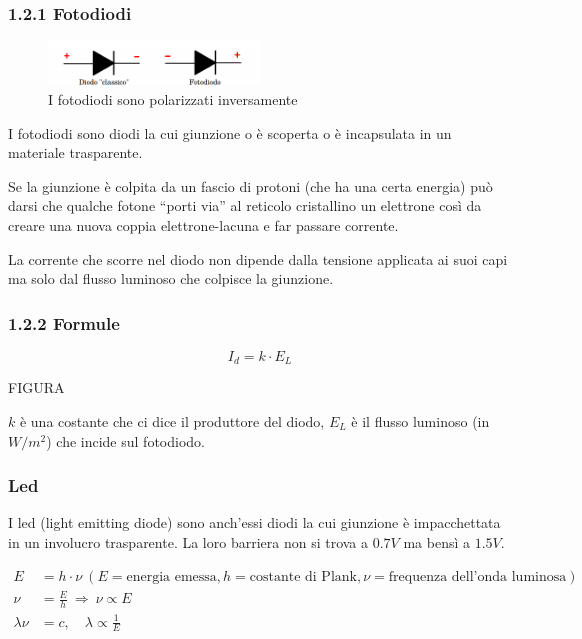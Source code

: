 \documentclass[
]{article}
\begin{document}
\subsubsection{1.2.1 Fotodiodi}\label{fotodiodi}

\begin{figure}
\centering
\includegraphics[width=0.5\textwidth,height=\textheight]{immagini/4.png}
\caption{I fotodiodi sono polarizzati inversamente}
\end{figure}

I fotodiodi sono diodi la cui giunzione o è scoperta o è incapsulata in
un materiale trasparente.

Se la giunzione è colpita da un fascio di protoni (che ha una certa
energia) può darsi che qualche fotone ``porti via'' al reticolo
cristallino un elettrone così da creare una nuova coppia
elettrone-lacuna e far passare corrente.

La corrente che scorre nel diodo non dipende dalla tensione applicata ai
suoi capi ma solo dal flusso luminoso che colpisce la giunzione.

\subsubsection{1.2.2 Formule}\label{formule-1}

\[
I_d = k \cdot E_{L}
\]

FIGURA

\(k\) è una costante che ci dice il produttore del diodo, \(E_L\) è il
flusso luminoso (in \(W /m^2\)) che incide sul fotodiodo.

\subsubsection{Led}\label{led}

I led (light emitting diode) sono anch'essi diodi la cui giunzione è
impacchettata in un involucro trasparente. La loro barriera non si trova
a \(0.7V\) ma bensì a \textbf{\(1.5V\)}.

\begin{align*}
E&=h\cdot\nu\ (E = \text{energia emessa}, h = \text{costante di Plank}, \nu = \text{frequenza
dell'onda luminosa})\\
\nu&=\frac{E}{h}\ \Longrightarrow\ \nu\propto E \\
\lambda\nu&=c, \quad \lambda\propto\frac{1}{E}
\end{align*}
\end{document}
